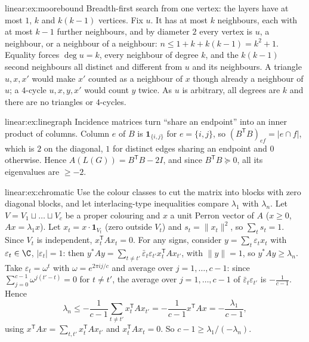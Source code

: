 \begin{solution}{linear:ex:moorebound}
\idea Breadth-first search from one vertex: the layers have at most $1$, $k$ and $k(k-1)$ vertices.
\writeup Fix $u$. It has at most $k$ neighbours, each with at most $k-1$ further neighbours, and by diameter $2$ every vertex is $u$, a
neighbour, or a neighbour of a neighbour: $n\le1+k+k(k-1)=k^2+1$. Equality forces $\deg u=k$, every neighbour of degree $k$, and the
$k(k-1)$ second neighbours all distinct and different from $u$ and its neighbours. A triangle $u,x,x'$ would make $x'$ counted as a
neighbour of $x$ though already a neighbour of $u$; a $4$-cycle $u,x,y,x'$ would count $y$ twice. As $u$ is arbitrary, all degrees are
$k$ and there are no triangles or $4$-cycles.
\end{solution}

\begin{solution}{linear:ex:linegraph}
\idea Incidence matrices turn ``share an endpoint'' into an inner product of columns.
\writeup Column $e$ of $B$ is $\mathbf 1_{\{i,j\}}$ for $e=\{i,j\}$, so $(B^{\mathsf T}B)_{ef}=|e\cap f|$, which is $2$ on the diagonal, $1$
for distinct edges sharing an endpoint and $0$ otherwise. Hence $A(L(G))=B^{\mathsf T}B-2I$, and since $B^{\mathsf T}B\succeq0$, all its
eigenvalues are $\ge-2$.
\end{solution}

\begin{solution}{linear:ex:chromatic}
\idea Use the colour classes to cut the matrix into blocks with zero diagonal blocks, and let interlacing-type inequalities compare
$\lambda_1$ with $\lambda_n$.
\writeup Let $V=V_1\sqcup\dots\sqcup V_c$ be a proper colouring and $x$ a unit Perron vector of $A$ ($x\ge0$, $Ax=\lambda_1x$). Let
$x_t=x\cdot\mathbf 1_{V_t}$ (zero outside $V_t$) and $s_t=\|x_t\|^2$, so $\sum_ts_t=1$. Since $V_t$ is independent, $x_t^{\mathsf T}Ax_t=0$.
For any signs, consider $y=\sum_t\varepsilon_tx_t$ with $\varepsilon_t\in\C$, $|\varepsilon_t|=1$: then $y^*Ay=\sum_{t\ne t'}\bar\varepsilon_t
\varepsilon_{t'}x_t^{\mathsf T}Ax_{t'}$, with $\|y\|=1$, so $y^*Ay\ge\lambda_n$. Take $\varepsilon_t=\omega^{t}$ with $\omega=e^{2\pi ij/c}$ and
average over $j=1,\dots,c-1$: since $\sum_{j=0}^{c-1}\omega^{j(t'-t)}=0$ for $t\ne t'$, the average over $j=1,\dots,c-1$ of
$\bar\varepsilon_t\varepsilon_{t'}$ is $-\frac1{c-1}$. Hence
\[
\lambda_n\le-\frac1{c-1}\sum_{t\ne t'}x_t^{\mathsf T}Ax_{t'}=-\frac1{c-1}x^{\mathsf T}Ax=-\frac{\lambda_1}{c-1},
\]
using $x^{\mathsf T}Ax=\sum_{t,t'}x_t^{\mathsf T}Ax_{t'}$ and $x_t^{\mathsf T}Ax_t=0$. So $c-1\ge\lambda_1/(-\lambda_n)$.
\end{solution}

